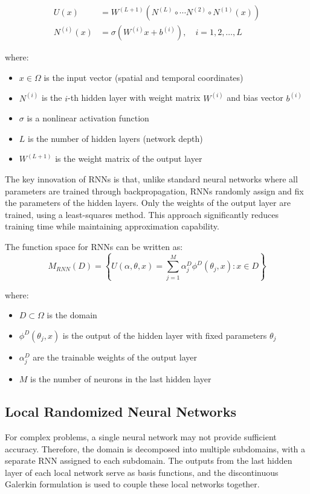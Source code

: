 \documentclass[11pt,a4paper]{article}
\begin{document}
\begin{align}
U(x) &= W^{(L+1)}(N^{(L)} \circ \cdots N^{(2)} \circ N^{(1)}(x)) \\
N^{(i)}(x) &= \sigma(W^{(i)}x + b^{(i)}), \quad i = 1,2,\ldots,L
\end{align}

where:
\begin{itemize}
    \item $x \in \Omega$ is the input vector (spatial and temporal coordinates)
    \item $N^{(i)}$ is the $i$-th hidden layer with weight matrix $W^{(i)}$ and bias vector $b^{(i)}$
    \item $\sigma$ is a nonlinear activation function
    \item $L$ is the number of hidden layers (network depth)
    \item $W^{(L+1)}$ is the weight matrix of the output layer
\end{itemize}

The key innovation of RNNs is that, unlike standard neural networks where all parameters are trained through backpropagation, RNNs randomly assign and fix the parameters of the hidden layers. Only the weights of the output layer are trained, using a least-squares method. This approach significantly reduces training time while maintaining approximation capability.

The function space for RNNs can be written as:
\begin{equation}
M_{RNN}(D) = \left\{U(\alpha, \theta, x) = \sum_{j=1}^{M} \alpha_j^D \phi^D(\theta_j, x) : x \in D\right\}
\end{equation}

where:
\begin{itemize}
    \item $D \subset \Omega$ is the domain
    \item $\phi^D(\theta_j, x)$ is the output of the hidden layer with fixed parameters $\theta_j$
    \item $\alpha_j^D$ are the trainable weights of the output layer
    \item $M$ is the number of neurons in the last hidden layer
\end{itemize}

\subsection{Local Randomized Neural Networks}

For complex problems, a single neural network may not provide sufficient accuracy. Therefore, the domain is decomposed into multiple subdomains, with a separate RNN assigned to each subdomain. The outputs from the last hidden layer of each local network serve as basis functions, and the discontinuous Galerkin formulation is used to couple these local networks together.
\end{document}
